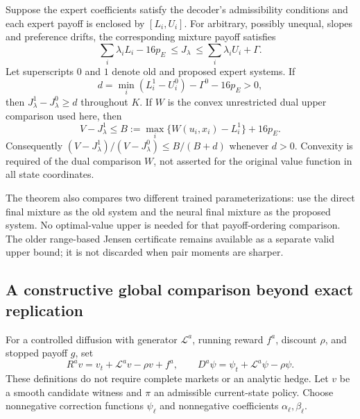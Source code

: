 \begin{theorem}\label{thm:r22jensen}
Suppose the expert coefficients satisfy the decoder's admissibility conditions and each expert payoff is enclosed by $[L_i,U_i]$. For arbitrary, possibly unequal, slopes and preference drifts, the corresponding mixture payoff satisfies
\[
 \sum_i\lambda_iL_i-16p_E\ \leq J_\lambda
 \ \leq\sum_i\lambda_iU_i+\Gamma.
\]
Let superscripts $0$ and $1$ denote old and proposed expert systems. If
\begin{equation}
 d=\min_i(L_i^1-U_i^0)-\Gamma^0-16p_E>0,\label{eq:r22gain}
\end{equation}
then $J_\lambda^1-J_\lambda^0\geq d$ throughout $K$. If $W$ is the convex unrestricted dual upper comparison used here, then
\[
 V-J_\lambda^1\leq B:=\max_i\{W(u_i,x_i)-L_i^1\}+16p_E.
\]
Consequently $(V-J_\lambda^1)/(V-J_\lambda^0)\leq B/(B+d)$ whenever $d>0$. Convexity is required of the dual comparison $W$, not asserted for the original value function in all state coordinates.
\end{theorem}

The theorem also compares two different trained parameterizations: use the direct final mixture as the old system and the neural final mixture as the proposed system. No optimal-value upper is needed for that payoff-ordering comparison. The older range-based Jensen certificate remains available as a separate valid upper bound; it is not discarded when pair moments are sharper.

\subsection{A constructive global comparison beyond exact replication}\label{sec:r22corrector}
For a controlled diffusion with generator $\mathcal L^a$, running reward $f^a$, discount $\rho$, and stopped payoff $g$, set
\[
 R^av=v_t+\mathcal L^av-\rho v+f^a,\qquad
 D^a\psi=\psi_t+\mathcal L^a\psi-\rho\psi.
\]
These definitions do not require complete markets or an analytic hedge. Let $v$ be a smooth candidate witness and $\pi$ an admissible current-state policy. Choose nonnegative correction functions $\psi_\ell$ and nonnegative coefficients $\alpha_\ell,\beta_\ell$.


